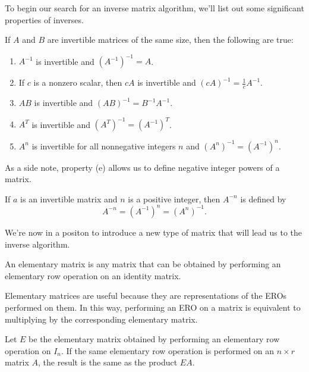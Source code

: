 \documentclass[../m073main.tex]{subfiles}
\begin{document}
To begin our search for an inverse matrix algorithm, we'll list out some significant properties of inverses.

\begin{theorem}
	If $A$ and $B$ are invertible matrices of the same size, then the following are true:
	\begin{enumerate}[label=(\alph*)]
		\item $A^{-1}$ is invertible and $(A^{-1})^{-1} = A$.
		\item If $c$ is a nonzero scalar, then $cA$ is invertible and $(cA)^{-1} = \frac{1}{c}A^{-1}$.
		\item $AB$ is invertible and $(AB)^{-1} = B^{-1}A^{-1}$.
		\item $A^T$ is invertible and $(A^T)^{-1} = (A^{-1})^T$.
		\item $A^n$ is invertible for all nonnegative integers $n$ and $(A^n)^{-1} = (A^{-1})^n$.
	\end{enumerate}
\end{theorem}

As a side note, property (e) allows us to define negative integer powers of a matrix.

\begin{definition}
	If $a$ is an invertible matrix and $n$ is a positive integer, then $A^{-n}$ is defined by
	\[ A^{-n} = (A^{-1})^n = (A^n)^{-1}. \]
\end{definition}

We're now in a positon to introduce a new type of matrix that will lead us to the inverse algorithm.

\begin{definition}
	An elementary matrix is any matrix that can be obtained by performing an elementary row operation on an identity matrix.
\end{definition}

Elementary matrices are useful because they are representations of the EROs performed on them.
In this way, performing an ERO on a matrix is equivalent to multiplying by the corresponding elementary matrix.

\begin{theorem}
	Let $E$ be the elementary matrix obtained by performing an elementary row operation on $I_n$.
	If the same elementary row operation is performed on an $n\times r$ matrix $A$, the result is the same as the product $EA$.
\end{theorem}
\end{document}
